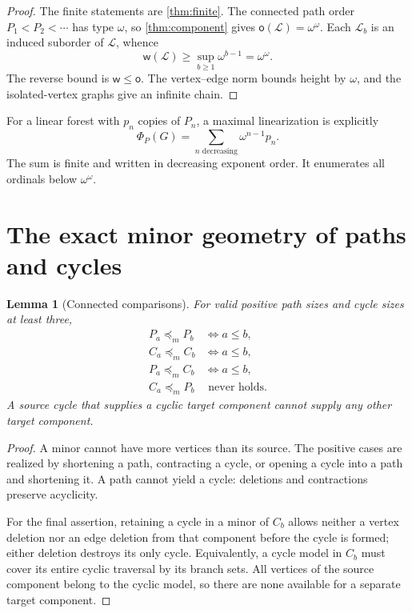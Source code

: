 \documentclass[11pt,letterpaper]{article}
\theoremstyle{plain}
\newtheorem{lemma}[lemma]{Lemma}
\theoremstyle{definition}
\theoremstyle{remark}
\newcommand{\mot}{\mathsf o}
\newcommand{\wid}{\mathsf w}
\newcommand{\minor}{\preccurlyeq_{\!m}}
\newcommand{\LF}{\mathcal L}
\begin{document}
\begin{proof}
The finite statements are \cref{thm:finite}. The connected path order
$P_1<P_2<\cdots$ has type $\omega$, so
\cref{thm:component} gives $\mot(\LF)=\omega^\omega$.
Each $\LF_b$ is an induced suborder of $\LF$, whence
\[
 \wid(\LF)\ge\sup_{b\ge1}\omega^{b-1}=\omega^\omega.
\]
The reverse bound is $\wid\le\mot$. The vertex--edge norm bounds
height by $\omega$, and the isolated-vertex graphs give an infinite
chain.
\end{proof}

For a linear forest with $p_n$ copies of $P_n$, a maximal linearization
is explicitly
\begin{equation}\label{eq:pathcode}
 \Phi_P(G)=\sum_{n\text{ decreasing}}\omega^{n-1}p_n.
\end{equation}
The sum is finite and written in decreasing exponent order.
It enumerates all ordinals below $\omega^\omega$.

\section{The exact minor geometry of paths and cycles}\label{sec:geometry}

\begin{lemma}[Connected comparisons]\label{lem:connecteddegree2}
For valid positive path sizes and cycle sizes at least three,
\begin{align*}
 P_a\minor P_b&\iff a\le b,\\
 C_a\minor C_b&\iff a\le b,\\
 P_a\minor C_b&\iff a\le b,\\
 C_a\minor P_b&\text{ never holds}.
\end{align*}
A source cycle that supplies a cyclic target component cannot supply
any other target component.
\end{lemma}

\begin{proof}
A minor cannot have more vertices than its source. The positive cases
are realized by shortening a path, contracting a cycle, or opening a
cycle into a path and shortening it. A path cannot yield a cycle:
deletions and contractions preserve acyclicity.

For the final assertion, retaining a cycle in a minor of $C_b$ allows
neither a vertex deletion nor an edge deletion from that component
before the cycle is formed; either deletion destroys its only cycle.
Equivalently, a cycle model in $C_b$ must cover its entire cyclic
traversal by its branch sets. All vertices of the source component
belong to the cyclic model, so there are none available for a separate
target component.
\end{proof}
\end{document}
